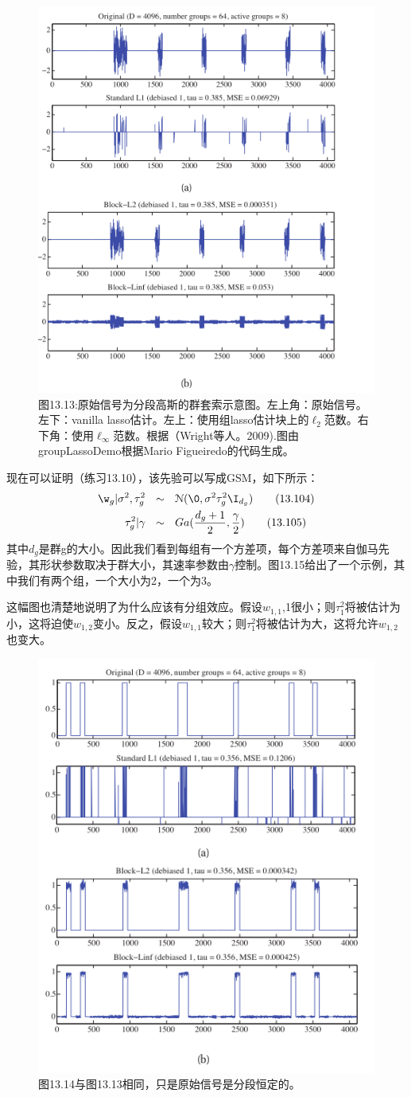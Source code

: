 \documentclass[a4paper]{article}
\begin{document}
\begin{figure}[h]
	\centering
	\includegraphics[width=0.5\linewidth]{fig13/figure13}
	\caption*{图13.13:原始信号为分段高斯的群套索示意图。左上角：原始信号。左下：vanilla lasso估计。左上：使用组lasso估计块上的$\ell_2$范数。右下角：使用$\ell_\infty$范数。根据（Wright等人。2009).图由groupLassoDemo根据Mario Figueiredo的代码生成。}
\end{figure}
现在可以证明（练习13.10），该先验可以写成GSM，如下所示：
\begin{align}
	\w_g|\sigma^2,\tau_g^2\ \ &\sim \ \ \mathcal{N}(\0,\sigma^2\tau_g^2\I_{d_g})\tag{13.104}\\
	\tau_g^2|\gamma\ \ &\sim\ \ Ga(\dfrac{d_g+1}{2},\frac{\gamma}{2})\tag{13.105}
\end{align}
其中$d_g$是群g的大小。因此我们看到每组有一个方差项，每个方差项来自伽马先验，其形状参数取决于群大小，其速率参数由$\gamma$控制。图13.15给出了一个示例，其中我们有两个组，一个大小为2，一个为3。

这幅图也清楚地说明了为什么应该有分组效应。假设$w_{1,1}$,1很小；则$\tau_1^2$将被估计为小，这将迫使$w_{1,2}$变小。反之，假设$w_{1,1}$较大；则$\tau_1^2$将被估计为大，这将允许$w_{1,2}$也变大。

\begin{figure}[h]
	\centering
	\includegraphics[width=0.4\linewidth]{fig13/figure14}
	\caption*{图13.14与图13.13相同，只是原始信号是分段恒定的。}
\end{figure}
\end{document}

